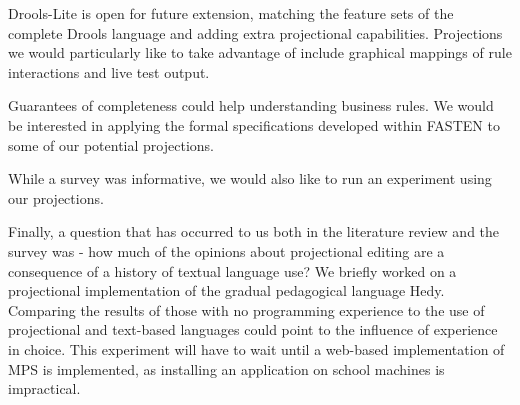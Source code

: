 Drools-Lite is open for future extension, matching the feature sets of the complete Drools language and adding extra projectional capabilities.
Projections we would particularly like to take advantage of include graphical mappings of rule interactions and live test output.

Guarantees of completeness could help understanding business rules.
We would be interested in applying the formal specifications developed within FASTEN\cite{ratiu2019fasten} to some of our potential projections.

While a survey was informative, we would also like to run an experiment using our projections.

Finally, a question that has occurred to us both in the literature review and the survey was - how much of the opinions about projectional editing are a consequence of a history of textual language use?
We briefly worked on a projectional implementation of the gradual pedagogical language Hedy\cite{hermans2020hedy}.
Comparing the results of those with no programming experience to the use of projectional and text-based languages could point to the influence of experience in choice.
This experiment will have to wait until a web-based implementation of MPS is implemented, as installing an application on school machines is impractical.

